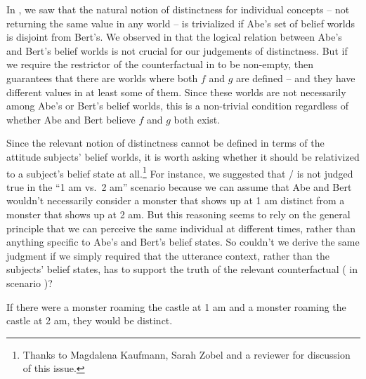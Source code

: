 \documentclass[output=paper]{langscibook}
\begin{document}
\noindent In , we saw that the natural notion of distinctness for individual concepts -- not returning the same value in any world -- is trivialized if Abe's set of belief worlds is disjoint from Bert's. We observed in  that the logical relation between Abe's and Bert's belief worlds is not crucial for our judgements of distinctness. But if we require the restrictor of the counterfactual in  to be non-empty, then  guarantees that there are worlds where both $f$ and $g$ are defined -- and they have different values in at least some of them. Since these worlds are not necessarily among Abe's or Bert's belief worlds, this is a non-trivial condition regardless of whether Abe and Bert believe $f$ and $g$ both exist.

Since the relevant notion of distinctness cannot be defined in terms of the attitude subjects' belief worlds, it is worth asking whether it should be relativized to a subject's belief state at all.\footnote{Thanks to Magdalena Kaufmann, Sarah Zobel and a reviewer for discussion of this issue.} For instance, we suggested that / is not judged true in the ``1 am vs.~2 am'' scenario  because we can assume that Abe and Bert wouldn't necessarily consider a monster that shows up at 1 am distinct from a monster that shows up at 2 am. But this reasoning seems to rely on the general principle that we can perceive the same individual at different times, rather than anything specific to Abe's and Bert's belief states. So couldn't we derive the same judgment if we simply required that the utterance context, rather than the subjects' belief states, has to support the truth of the relevant counterfactual ( in scenario )?

\eanoraggedright \label{sch-has:ex:rev4} If there were a monster roaming the castle at 1 am and a monster roaming the castle at 2 am, they would be distinct.\z
\end{document}
